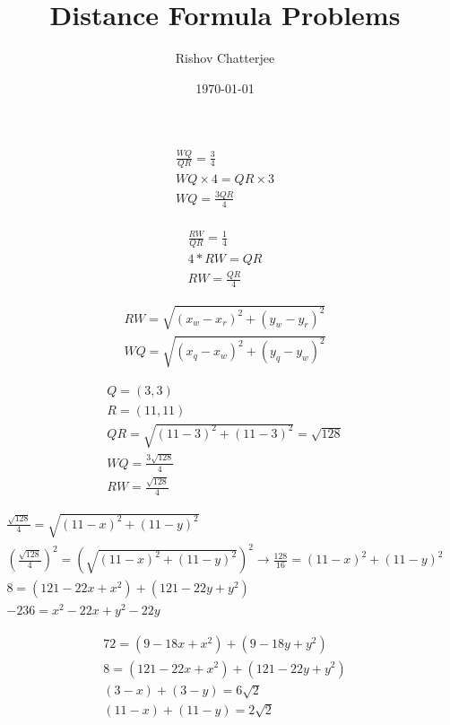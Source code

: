 \documentclass{article}
\begin{document}
\author{Rishov Chatterjee}
\title{Distance Formula Problems}
\date{\today}
\maketitle{}


\begin{center}
  \begin{align}
    \frac{WQ}{QR} = \frac{3}{4} \\
    WQ \times 4 = QR \times 3 \\
    WQ = \frac{3 QR}{4} \\
  \end{align}
  \par
  \begin{align}
    \frac{RW}{QR} = \frac{1}{4} \\
    4 * RW = QR \\
    RW = \frac{QR}{4}
  \end{align}
  \par
  \begin{align}
    RW = \sqrt{(x_w - x_r)^2 + (y_w - y_r)^2} \\
    WQ = \sqrt{(x_q - x_w)^2 + (y_q - y_w)^2}
  \end{align}
  \par
  \begin{align}
    Q = (3,3) \\
    R = (11,11) \\
    QR = \sqrt{(11 -3)^2 + (11 - 3)^2} = \sqrt{128} \\
    WQ = \frac{3 \sqrt{128}}{4} \\
    RW = \frac{\sqrt{128}}{4}
  \end{align}
  \par
  \begin{align}
    \frac{\sqrt{128}}{4} = \sqrt{(11 - x)^2 + (11 - y)^2} \\
    (\frac{\sqrt{128}}{4})^2 = (\sqrt{(11 - x)^2 + (11 - y)^2})^2 \rightarrow \frac{128}{16} = (11 - x)^2 + (11 - y)^2 \\
    8 = (121 - 22x + x^2) + (121 - 22y + y^2) \\
    -236 = x^2 - 22x + y^2 - 22y
  \end{align}
  \par
  \begin{align}
    72 = (9 - 18x + x^2) + (9 - 18y + y^2) \\
    8 = (121 - 22x + x^2) + (121 - 22y + y^2) \\
    (3 - x) + (3 - y) = 6\sqrt{2} \\ 
    (11 - x) + (11 - y) = 2\sqrt{2} \\
  \end{align}
  \par
\end{center}
\end{document}
